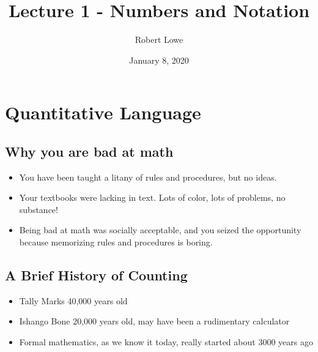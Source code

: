 \documentclass{article}
\title{Lecture 1 - Numbers and Notation}
\author{Robert Lowe}
\date{January 8, 2020}
\begin{document}
\maketitle
\section{Quantitative Language}
\subsection{Why you are bad at math}
\begin{itemize}
    \item You have been taught a litany of rules and procedures, but no ideas.
    \item Your textbooks were lacking in text.  Lots of color, lots of problems, no substance!
    \item Being bad at math was socially acceptable, and you seized the opportunity because memorizing rules and procedures is boring.
\end{itemize}
\subsection{A Brief History of Counting}
\begin{itemize}
    \item Tally Marks 40,000 years old 
    \item Ishango Bone 20,000 years old, may have been a rudimentary calculator
    \item Formal mathematics, as we know it today, really started about 3000 years ago
\end{itemize}
\end{document}
